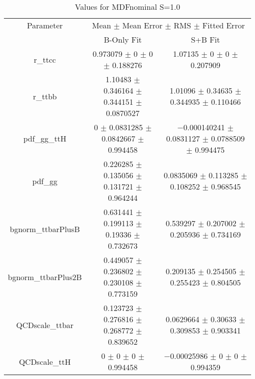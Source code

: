 \begin{table}
\centering
\caption{Values for MDFnominal S=1.0}
\begin{tabular}{ccc}
\toprule
Parameter & \multicolumn{2}{c}{Mean $\pm$ Mean Error $\pm$ RMS $\pm$ Fitted Error}\\
 & B-Only Fit & S+B Fit\\
\midrule
r\_ttcc & \num{0.973079} $\pm$ \num{0} $\pm$ \num{0} $\pm$ \num{0.188276} & \num{1.07135} $\pm$ \num{0} $\pm$ \num{0} $\pm$ \num{0.207909}\\
r\_ttbb & \num{1.10483} $\pm$ \num{0.346164} $\pm$ \num{0.344151} $\pm$ \num{0.0870527} & \num{1.01096} $\pm$ \num{0.34635} $\pm$ \num{0.344935} $\pm$ \num{0.110466}\\
pdf\_gg\_ttH & \num{0} $\pm$ \num{0.0831285} $\pm$ \num{0.0842667} $\pm$ \num{0.994458} & \num{-0.000140241} $\pm$ \num{0.0831127} $\pm$ \num{0.0788509} $\pm$ \num{0.994475}\\
pdf\_gg & \num{0.226285} $\pm$ \num{0.135056} $\pm$ \num{0.131721} $\pm$ \num{0.964244} & \num{0.0835069} $\pm$ \num{0.113285} $\pm$ \num{0.108252} $\pm$ \num{0.968545}\\
bgnorm\_ttbarPlusB & \num{0.631441} $\pm$ \num{0.199113} $\pm$ \num{0.19336} $\pm$ \num{0.732673} & \num{0.539297} $\pm$ \num{0.207002} $\pm$ \num{0.205936} $\pm$ \num{0.734169}\\
bgnorm\_ttbarPlus2B & \num{0.449057} $\pm$ \num{0.236802} $\pm$ \num{0.230108} $\pm$ \num{0.773159} & \num{0.209135} $\pm$ \num{0.254505} $\pm$ \num{0.255423} $\pm$ \num{0.804505}\\
QCDscale\_ttbar & \num{0.123723} $\pm$ \num{0.276816} $\pm$ \num{0.268772} $\pm$ \num{0.839652} & \num{0.0629664} $\pm$ \num{0.30633} $\pm$ \num{0.309853} $\pm$ \num{0.903341}\\
QCDscale\_ttH & \num{0} $\pm$ \num{0} $\pm$ \num{0} $\pm$ \num{0.994458} & \num{-0.00025986} $\pm$ \num{0} $\pm$ \num{0} $\pm$ \num{0.994359}\\
\bottomrule
\end{tabular}
\end{table}